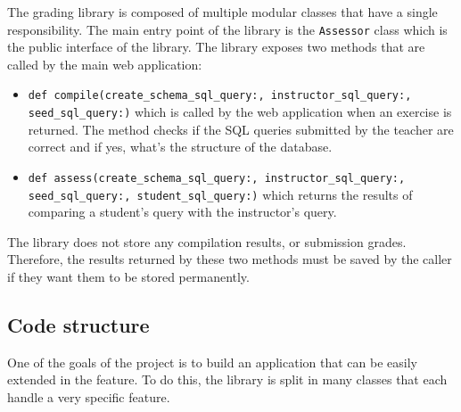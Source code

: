 The grading library is composed of multiple modular classes that have a single responsibility. The main entry point of the library is the \texttt{Assessor} class which is the public interface of the library. The library exposes two methods that are called by the main web application:

\begin{itemize}
    \item \texttt{def compile(create_schema_sql_query:, instructor_sql_query:, seed_sql_query:)} which is called by the web application when an exercise is returned. The method checks if the SQL queries submitted by the teacher are correct and if yes, what's the structure of the database.
    \item \texttt{def assess(create_schema_sql_query:, instructor_sql_query:, seed_sql_query:, student_sql_query:)} which returns the results of comparing a student's query with the instructor's query.
\end{itemize}

The library does not store any compilation results, or submission grades. Therefore, the results returned by these two methods must be saved by the caller if they want them to be stored permanently.

\subsection{Code structure}

One of the goals of the project is to build an application that can be easily extended in the feature. To do this, the library is split in many classes that each handle a very specific feature.

